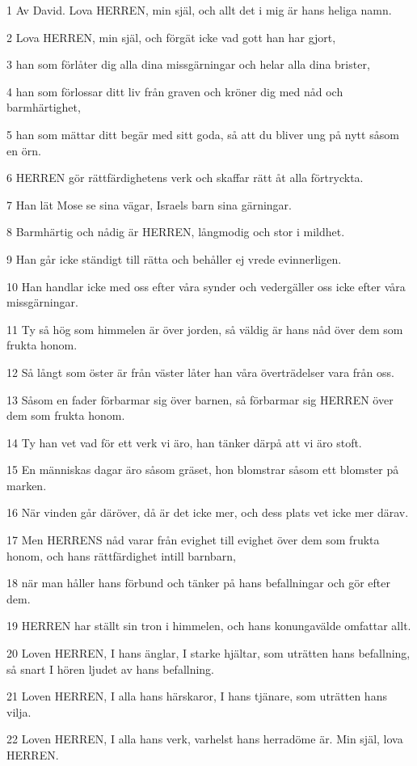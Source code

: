 \par 1 Av David. Lova HERREN, min själ, och allt det i mig är hans heliga namn.
\par 2 Lova HERREN, min själ, och förgät icke vad gott han har gjort,
\par 3 han som förlåter dig alla dina missgärningar och helar alla dina brister,
\par 4 han som förlossar ditt liv från graven och kröner dig med nåd och barmhärtighet,
\par 5 han som mättar ditt begär med sitt goda, så att du bliver ung på nytt såsom en örn.
\par 6 HERREN gör rättfärdighetens verk och skaffar rätt åt alla förtryckta.
\par 7 Han lät Mose se sina vägar, Israels barn sina gärningar.
\par 8 Barmhärtig och nådig är HERREN, långmodig och stor i mildhet.
\par 9 Han går icke ständigt till rätta och behåller ej vrede evinnerligen.
\par 10 Han handlar icke med oss efter våra synder och vedergäller oss icke efter våra missgärningar.
\par 11 Ty så hög som himmelen är över jorden, så väldig är hans nåd över dem som frukta honom.
\par 12 Så långt som öster är från väster låter han våra överträdelser vara från oss.
\par 13 Såsom en fader förbarmar sig över barnen, så förbarmar sig HERREN över dem som frukta honom.
\par 14 Ty han vet vad för ett verk vi äro, han tänker därpå att vi äro stoft.
\par 15 En människas dagar äro såsom gräset, hon blomstrar såsom ett blomster på marken.
\par 16 När vinden går däröver, då är det icke mer, och dess plats vet icke mer därav.
\par 17 Men HERRENS nåd varar från evighet till evighet över dem som frukta honom, och hans rättfärdighet intill barnbarn,
\par 18 när man håller hans förbund och tänker på hans befallningar och gör efter dem.
\par 19 HERREN har ställt sin tron i himmelen, och hans konungavälde omfattar allt.
\par 20 Loven HERREN, I hans änglar, I starke hjältar, som uträtten hans befallning, så snart I hören ljudet av hans befallning.
\par 21 Loven HERREN, I alla hans härskaror, I hans tjänare, som uträtten hans vilja.
\par 22 Loven HERREN, I alla hans verk, varhelst hans herradöme är. Min själ, lova HERREN.

